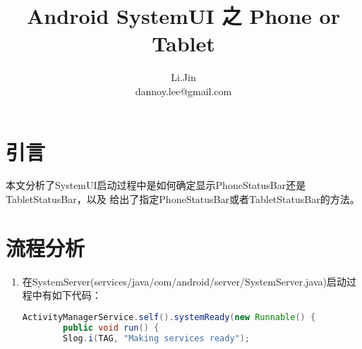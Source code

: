 \documentclass[a4paper,11pt]{article}
\author{Li.Jin \\
    dannoy.lee@gmail.com
    }
\begin{document}
\begin{CJK*}{UTF8}{gbsn}
\title{Android SystemUI 之 Phone or Tablet}


\hfuzz=150pt
\maketitle


\setcounter{page}{1}
\section{引言}
本文分析了SystemUI启动过程中是如何确定显示PhoneStatusBar还是TabletStatusBar，以及
给出了指定PhoneStatusBar或者TabletStatusBar的方法。


\section{流程分析}
    \begin{enumerate}
        \item 在SystemServer(services/java/com/android/server/SystemServer.java)启动过程中有如下代码：
\begin{lstlisting}[language=JAVA]
ActivityManagerService.self().systemReady(new Runnable() {
        public void run() {
        Slog.i(TAG, "Making services ready");


\end{lstlisting}
\end{enumerate}
\end{CJK*}
\end{document}

